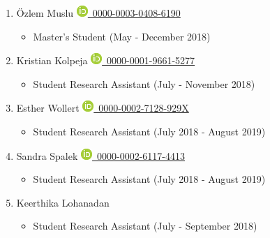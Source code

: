 \documentclass[11pt,a4paper,sans]{moderncv} %
\begin{document}
\begin{enumerate}
        \item
            Özlem Muslu {\scriptsize     \href{https://orcid.org/0000-0003-0408-6190}{\includegraphics[scale=0.5]{img/ORCIDiD_icon16x16}\ 0000-0003-0408-6190}
}    \begin{itemize}
        \item
    {\scriptsize Master's Student (May - December 2018)}
    \end{itemize}

        \item
            Kristian Kolpeja {\scriptsize     \href{https://orcid.org/0000-0001-9661-5277}{\includegraphics[scale=0.5]{img/ORCIDiD_icon16x16}\ 0000-0001-9661-5277}
}    \begin{itemize}
        \item
    {\scriptsize Student Research Assistant (July - November 2018)}
    \end{itemize}

        \item
            Esther Wollert {\scriptsize     \href{https://orcid.org/0000-0002-7128-929X}{\includegraphics[scale=0.5]{img/ORCIDiD_icon16x16}\ 0000-0002-7128-929X}
}    \begin{itemize}
        \item
    {\scriptsize Student Research Assistant (July 2018 - August 2019)}
    \end{itemize}

        \item
            Sandra Spalek {\scriptsize     \href{https://orcid.org/0000-0002-6117-4413}{\includegraphics[scale=0.5]{img/ORCIDiD_icon16x16}\ 0000-0002-6117-4413}
}    \begin{itemize}
        \item
    {\scriptsize Student Research Assistant (July 2018 - August 2019)}
    \end{itemize}

        \item
            Keerthika Lohanadan     \begin{itemize}
        \item
    {\scriptsize Student Research Assistant (July - September 2018)}
    \end{itemize}


\end{enumerate}
\end{document}
